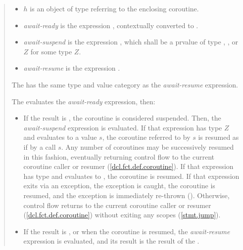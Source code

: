 \begin{quote}
\begin{itemize}
  \item $h$ is an object of type  referring to the enclosing coroutine.
  \item \textit{await-ready} is the expression , contextually converted to .
  \item \textit{await-suspend} is the expression , which shall be a prvalue of type , , or $Z$\tcode{>} for some type $Z$.
  \item \textit{await-resume} is the expression .
\end{itemize}

\pnum The  has the same type and value category as the \textit{await-resume} expression.

\pnum The  evaluates the \textit{await-ready} expression, then:
\begin{itemize}
  \item If the result is , the coroutine is considered suspended. Then, the \textit{await-suspend} expression is evaluated.
   If that expression has type $Z$\tcode{>} and evaluates to a value $s$, the coroutine referred to by $s$ is resumed as if by a call $s$. \enternote Any number of coroutines may be successively resumed in this fashion, eventually returning control flow to the current coroutine caller or resumer (\ref{dcl.fct.def.coroutine}). \exitnote 
  If that expression has
  type  and evaluates to , the coroutine is resumed.
  If that expression exits via an exception, the exception is caught, the coroutine is resumed, and the exception is immediately re-thrown (). Otherwise, control flow returns to the current coroutine caller or resumer (\ref{dcl.fct.def.coroutine}) without exiting any scopes (\ref{stmt.jump}).
  \item If the result is , or when the coroutine is resumed, the \textit{await-resume} expression is evaluated, and its result is the result of the .
  

\end{itemize}
\end{quote}
